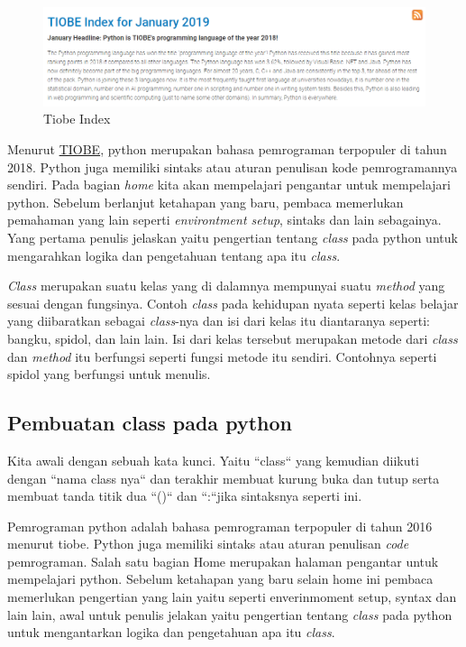 \begin{enumerate}
\begin{figure}[!htbp]
\centerline{\includegraphics[width=75\textwidth]{figures/tiobe.PNG}}
\caption{Tiobe Index}
\label{tiobe}
\end{figure}
Menurut \href{https://www.tiobe.com/tiobe-index/}{TIOBE}, python merupakan bahasa pemrograman terpopuler di tahun 2018. Python juga memiliki sintaks atau aturan penulisan kode pemrogramannya sendiri. Pada bagian \textit{home} kita akan mempelajari pengantar untuk mempelajari python. Sebelum berlanjut ketahapan yang baru, pembaca memerlukan pemahaman yang lain seperti \textit{environtment setup}, sintaks dan lain sebagainya. Yang pertama penulis jelaskan yaitu pengertian tentang \textit{class} pada python untuk mengarahkan logika dan pengetahuan tentang apa itu \textit{class}.

\textit{Class} merupakan suatu kelas yang di dalamnya mempunyai suatu \textit{method} yang sesuai dengan fungsinya. Contoh \textit{class} pada kehidupan nyata seperti kelas belajar yang diibaratkan sebagai \textit{class}-nya dan isi dari kelas itu diantaranya seperti: bangku, spidol, dan lain lain. Isi dari kelas tersebut merupakan metode dari \textit{class} dan \textit{method} itu berfungsi seperti fungsi metode itu sendiri. Contohnya seperti spidol yang berfungsi untuk menulis.
\subsection{Pembuatan class pada python}
Kita awali dengan sebuah kata kunci. Yaitu  ``class`` yang kemudian diikuti dengan ``nama class nya`` dan terakhir membuat kurung buka dan tutup serta membuat tanda titik dua  ``()`` dan ``:``jika sintaksnya seperti ini.

Pemrograman python adalah bahasa pemrograman terpopuler di tahun 2016 menurut tiobe. Python juga memiliki sintaks atau aturan penulisan \textit{code} pemrograman. Salah satu bagian Home merupakan halaman pengantar untuk mempelajari python. Sebelum ketahapan yang baru selain home ini pembaca memerlukan pengertian yang lain yaitu seperti enverinmoment setup, syntax dan lain lain, awal untuk penulis jelakan yaitu pengertian tentang \textit{class} pada python untuk mengantarkan logika dan pengetahuan apa itu \textit{class}.



\end{enumerate}
